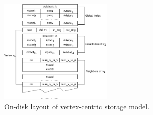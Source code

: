 \begin{figure}[ht]
  \centering
  \includegraphics[width=0.48\textwidth]{img/data_graph.pdf}
\caption{On-disk layout of vertex-centric storage model.}
\label{img:data_graph}
\end{figure}
